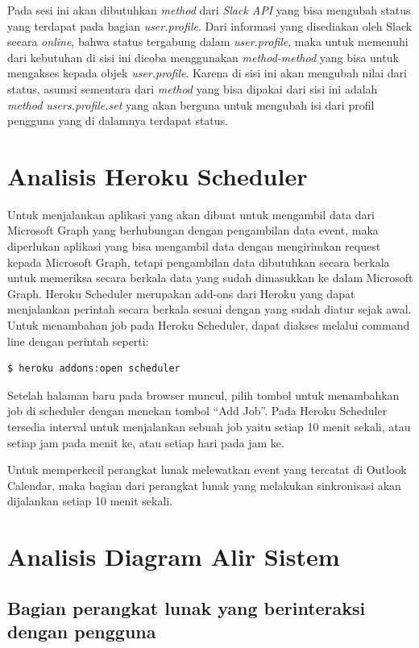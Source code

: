 Pada sesi ini akan dibutuhkan \textit{method} dari \textit{Slack API} yang bisa mengubah status yang terdapat pada bagian \textit{user.profile}. Dari informasi yang disediakan oleh Slack secara \textit{online}, bahwa status tergabung dalam \textit{user.profile}, maka untuk memenuhi dari kebutuhan di sisi ini dicoba menggunakan \textit{method-method} yang bisa untuk mengakses kepada objek \textit{user.profile}. Karena di sisi ini akan mengubah nilai dari status, asumsi sementara dari \textit{method} yang bisa dipakai dari sisi ini adalah \textit{method users.profile.set} yang akan berguna untuk mengubah isi dari profil pengguna yang di dalamnya terdapat status. 

\section{Analisis Heroku Scheduler}
\label{sec:analisis_cron}
Untuk menjalankan aplikasi yang akan dibuat untuk mengambil data dari Microsoft Graph yang berhubungan dengan pengambilan data event, maka diperlukan aplikasi yang bisa mengambil data dengan mengirimkan request kepada Microsoft Graph, tetapi pengambilan data dibutuhkan secara berkala untuk memeriksa secara berkala data yang sudah dimasukkan ke dalam Microsoft Graph. Heroku Scheduler merupakan add-ons dari Heroku yang dapat menjalankan perintah secara berkala sesuai dengan yang sudah diatur sejak awal. Untuk menambahan job pada Heroku Scheduler, dapat diakses melalui command line dengan perintah seperti:

\begin{lstlisting}
$ heroku addons:open scheduler
\end{lstlisting}

Setelah halaman baru pada browser muncul, pilih tombol untuk menambahkan job di scheduler dengan menekan tombol ``Add Job''. Pada Heroku Scheduler tersedia interval untuk menjalankan sebuah job yaitu setiap 10 menit sekali, atau setiap jam pada menit ke, atau setiap hari pada jam ke.

Untuk memperkecil perangkat lunak melewatkan event yang tercatat di Outlook Calendar, maka bagian dari perangkat lunak yang melakukan sinkronisasi akan dijalankan setiap 10 menit sekali. 

\section{Analisis Diagram Alir Sistem}
\subsection{Bagian perangkat lunak yang berinteraksi dengan pengguna}


